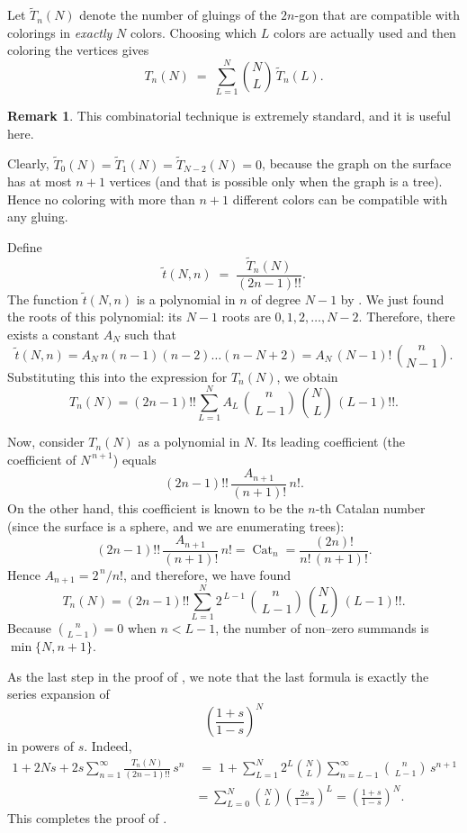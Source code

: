 \documentclass[letterpaper,11pt,oneside,reqno]{book}
\numberwithin{equation}{chapter}  %
\theoremstyle{definition}
\newtheorem{remark}[proposition]{Remark}
\begin{document}
Let $\tilde T_n(N)$ denote the number of gluings of the $2n$-gon that
are compatible with colorings in \emph{exactly} $N$ colors.
Choosing which $L$ colors are actually used and then coloring the
vertices gives
\[
   T_n(N)\;=\;\sum_{L=1}^{N}\binom{N}{L}\,\tilde T_n(L).
\]
\begin{remark}
	This combinatorial technique is extremely standard, and it
	is useful here.
\end{remark}

Clearly, $\tilde T_0(N)=\tilde T_1(N)=\tilde T_{N-2}(N)=0$, because the
graph on the surface has at most $n+1$ vertices (and that is possible
only when the graph is a tree).  Hence no coloring with more than
$n+1$ different colors can be compatible with any gluing.

Define
\[
    \tilde t(N,n)\;=\;\frac{\tilde T_n(N)}{(2n-1)!!}.
\]
The function $\tilde t(N,n)$ is a polynomial in $n$ of degree
$N-1$ by .
We just found the roots of this polynomial:
its $N-1$ roots are $0,1,2,\dots,N-2$.  Therefore, there exists a
constant $A_N$ such that
\[
   \tilde t(N,n)
       =A_N\,n(n-1)(n-2)\dots(n-N+2)
       =A_N\,(N-1)!\,\binom{n}{N-1}.
\]
Substituting this into the expression for $T_n(N)$, we obtain
\[
  T_n(N)
     =(2n-1)!!
       \sum_{L=1}^{N}
         A_L\,
         \binom{n}{\,L-1}\,
         \binom{N}{\,L}\,
         (L-1)!!.
\]

Now, consider $T_n(N)$ as a polynomial in $N$.  Its leading coefficient (the
coefficient of $N^{\,n+1}$) equals
\[
  (2n-1)!!\,
  \frac{A_{n+1}}{(n+1)!}\,n!.
\]
On the other hand, this coefficient is known to be the $n$-th Catalan
number (since the surface is a sphere, and we are enumerating trees):
\[
  (2n-1)!!\,
  \frac{A_{n+1}}{(n+1)!}\,n!
      =\operatorname{Cat}_n
      =\frac{(2n)!}{n!\,(n+1)!}.
\]
Hence $A_{n+1}=2^{\,n}/n!$, and therefore, we have found
\[
  T_n(N)
     =(2n-1)!!
       \sum_{L=1}^{N}
         2^{\,L-1}\,
         \binom{n}{\,L-1}\,
         \binom{N}{\,L}\,
         (L-1)!!.
\]
Because $\binom{n}{L-1}=0$ when $n<L-1$, the number of non–zero summands
is $\min\{N,n+1\}$.

\medskip
As the last step in the proof of , we note that
the last formula is exactly the series expansion of
\[
   \left(\frac{1+s}{1-s}\right)^{\!N}
\]
in powers of $s$. Indeed,
\[
  \begin{aligned}
     1+2Ns
     +2s\sum_{n=1}^{\infty}
          \frac{T_n(N)}{(2n-1)!!}\,s^{n}
     &\;=\;
       1+\sum_{L=1}^{N}
             2^{L}\binom{N}{L}
             \sum_{n=L-1}^{\infty}
               \binom{n}{\,L-1}\,s^{n+1}\\[4pt]
     &=\sum_{L=0}^{N}
          \binom{N}{L}
          \left(\frac{2s}{1-s}\right)^{\!L}
       =\left(\frac{1+s}{1-s}\right)^{\!N}.
  \end{aligned}
\]
This completes the proof of .
\end{document}
